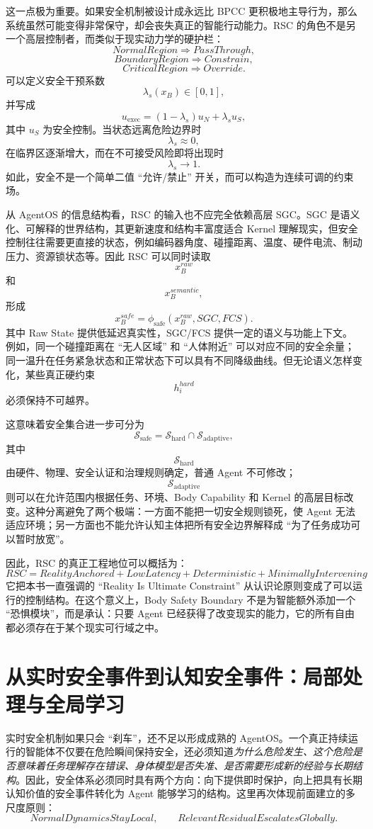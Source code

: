 这一点极为重要。如果安全机制被设计成永远比 BPCC 更积极地主导行为，那么系统虽然可能变得非常保守，却会丧失真正的智能行动能力。RSC 的角色不是另一个高层控制者，而类似于现实动力学的硬护栏：
\[
NormalRegion
\Rightarrow
PassThrough,
\]
\[
BoundaryRegion
\Rightarrow
Constrain,
\]
\[
CriticalRegion
\Rightarrow
Override.
\]
可以定义安全干预系数
\[
\lambda_s(x_B)\in[0,1],
\]
并写成
\[
u_{\mathrm{exec}}
=
(1-\lambda_s)u_N
+
\lambda_su_S,
\]
其中 $u_S$ 为安全控制。当状态远离危险边界时
\[
\lambda_s\approx0,
\]
在临界区逐渐增大，而在不可接受风险即将出现时
\[
\lambda_s\rightarrow1.
\]
如此，安全不是一个简单二值 ``允许/禁止'' 开关，而可以构造为连续可调的约束场。

从 AgentOS 的信息结构看，RSC 的输入也不应完全依赖高层 SGC。SGC 是语义化、可解释的世界结构，其更新速度和结构丰富度适合 Kernel 理解现实，但安全控制往往需要更直接的状态，例如编码器角度、碰撞距离、温度、硬件电流、制动压力、资源锁状态等。因此 RSC 可以同时读取
\[
x_B^{raw}
\]
和
\[
x_B^{semantic},
\]
形成
\[
x_B^{safe}
=
\phi_{\mathrm{safe}}
(
x_B^{raw},
SGC,
FCS
).
\]
其中 Raw State 提供低延迟真实性，SGC/FCS 提供一定的语义与功能上下文。例如，同一个碰撞距离在 ``无人区域'' 和 ``人体附近'' 可以对应不同的安全余量；同一温升在任务紧急状态和正常状态下可以具有不同降级曲线。但无论语义怎样变化，某些真正硬约束
\[
h_i^{hard}
\]
必须保持不可越界。

这意味着安全集合进一步可分为
\[
\mathcal S_{\mathrm{safe}}
=
\mathcal S_{\mathrm{hard}}
\cap
\mathcal S_{\mathrm{adaptive}},
\]
其中
\[
\mathcal S_{\mathrm{hard}}
\]
由硬件、物理、安全认证和治理规则确定，普通 Agent 不可修改；
\[
\mathcal S_{\mathrm{adaptive}}
\]
则可以在允许范围内根据任务、环境、Body Capability 和 Kernel 的高层目标改变。这种分离避免了两个极端：一方面不能把一切安全规则锁死，使 Agent 无法适应环境；另一方面也不能允许认知主体把所有安全边界解释成 ``为了任务成功可以暂时放宽''。

因此，RSC 的真正工程地位可以概括为：
\[
\boxed{
RSC
=
RealityAnchored
+
LowLatency
+
Deterministic
+
MinimallyIntervening
}
\]
它把本书一直强调的 ``Reality Is Ultimate Constraint'' 从认识论原则变成了可以运行的控制结构。在这个意义上，Body Safety Boundary 不是为智能额外添加一个 ``恐惧模块''，而是承认：只要 Agent 已经获得了改变现实的能力，它的所有自由都必须存在于某个现实可行域之中。

\section{从实时安全事件到认知安全事件：局部处理与全局学习}

实时安全机制如果只会 ``刹车''，还不足以形成成熟的 AgentOS。一个真正持续运行的智能体不仅要在危险瞬间保持安全，还必须知道\emph{为什么危险发生、这个危险是否意味着任务理解存在错误、身体模型是否失准、是否需要形成新的经验与长期结构}。因此，安全体系必须同时具有两个方向：向下提供即时保护，向上把具有长期认知价值的安全事件转化为 Agent 能够学习的结构。这里再次体现前面建立的多尺度原则：
\[
\boxed{
NormalDynamicsStayLocal,
\qquad
RelevantResidualEscalatesGlobally.
}
\]

